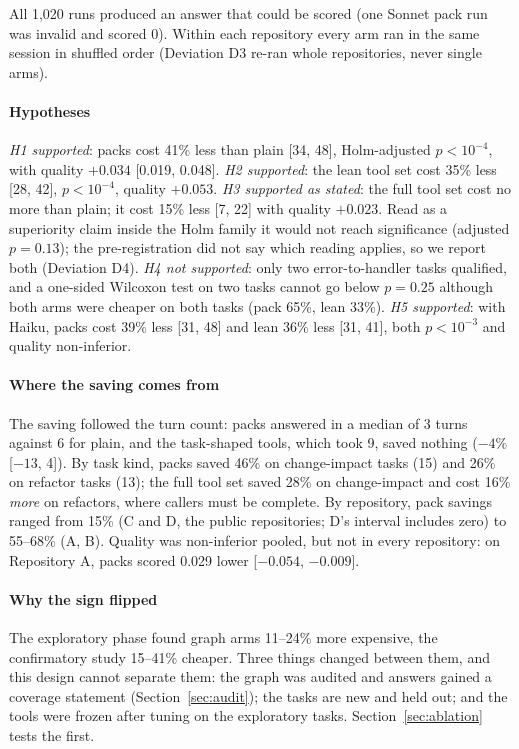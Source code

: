All 1,020 runs produced an answer that could be scored (one Sonnet pack run was invalid and scored 0). Within each
repository every arm ran in the same session in shuffled order (Deviation D3 re-ran whole repositories, never single
arms).

\paragraph{Hypotheses} \emph{H1 supported}: packs cost 41\% less than plain [34, 48], Holm-adjusted $p<10^{-4}$, with
quality $+0.034$ [0.019, 0.048]. \emph{H2 supported}: the lean tool set cost 35\% less [28, 42], $p<10^{-4}$, quality
$+0.053$. \emph{H3 supported as stated}: the full tool set cost no more than plain; it cost 15\% less [7, 22] with
quality $+0.023$. Read as a superiority claim inside the Holm family it would not reach significance (adjusted
$p=0.13$); the pre-registration did not say which reading applies, so we report both (Deviation D4). \emph{H4 not
supported}: only two error-to-handler tasks qualified, and a one-sided Wilcoxon test on two tasks cannot go below
$p=0.25$ although both arms were cheaper on both tasks (pack 65\%, lean 33\%). \emph{H5 supported}: with Haiku, packs
cost 39\% less [31, 48] and lean 36\% less [31, 41], both $p<10^{-3}$ and quality non-inferior.

\paragraph{Where the saving comes from} The saving followed the turn count: packs answered in a median of 3 turns
against 6 for plain, and the task-shaped tools, which took 9, saved nothing ($-4\%$ [$-13$, 4]). By task kind, packs
saved 46\% on change-impact tasks (15) and 26\% on refactor tasks (13); the full tool set saved 28\% on change-impact
and cost 16\% \emph{more} on refactors, where callers must be complete. By repository, pack savings ranged from 15\%
(C and D, the public repositories; D's interval includes zero) to 55--68\% (A, B). Quality was non-inferior pooled,
but not in every repository: on Repository A, packs scored 0.029 lower [$-0.054$, $-0.009$].

\paragraph{Why the sign flipped} The exploratory phase found graph arms 11--24\% more expensive, the confirmatory study
15--41\% cheaper. Three things changed between them, and this design cannot separate them: the graph was audited and
answers gained a coverage statement (Section~\ref{sec:audit}); the tasks are new and held out; and the tools were
frozen after tuning on the exploratory tasks. Section~\ref{sec:ablation} tests the first.

